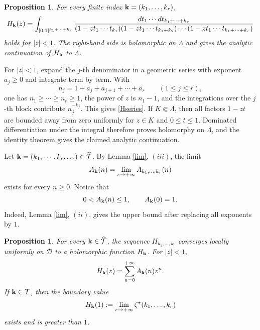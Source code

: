 \documentclass[12pt,a4paper]{amsart}
\makeatletter
\numberwithin{equation}{section}
\renewenvironment{proof}[1][Proof]{%
  \par\pushQED{\qed}%
  \normalfont\topsep6\p@\@plus6\p@\relax
  \trivlist
  \item[\hskip\labelsep\bfseries #1:]\ignorespaces
}{%
  \popQED\endtrivlist\@endpefalse
}
\theoremstyle{plain}
\newtheorem{prop}[Thm]{Proposition}
\theoremstyle{definition}
\makeatother
\begin{document}
\begin{prop}\label{equ}
For every finite index ${\bf k}=(k_1,\ldots,k_r)$,
\begin{equation}\label{cubeint}
H_{\bf k}(z)=
\int_{[0,1]^{k_1+\cdots+k_r}}
\frac{dt_1\cdots dt_{k_1+\cdots+k_r}}
{(1-zt_1\cdots t_{k_1})
 (1-zt_1\cdots t_{k_1+k_2})\cdots
 (1-zt_1\cdots t_{k_1+\cdots+k_r})}
\end{equation}
holds for $|z|<1$.  The right-hand side is holomorphic on $\Lambda$ and gives the analytic continuation of $H_{\bf k}$ to $\Lambda$.
\end{prop}

\begin{proof}
For $|z|<1$, expand the $j$-th denominator in a geometric series with exponent $a_j\geq0$ and integrate term by term.  With
\[
n_j=1+a_j+a_{j+1}+\cdots+a_r\qquad(1\leq j\leq r),
\]
one has $n_1\geq\cdots\geq n_r\geq1$, the power of $z$ is $n_1-1$, and the integrations over the $j$-th block contribute $n_j^{-k_j}$.  This gives \eqref{Hseries}.  If $K\Subset\Lambda$, then all factors $1-zt$ are bounded away from zero uniformly for $z\in K$ and $0\leq t\leq1$.  Dominated differentiation under the integral therefore proves holomorphy on $\Lambda$, and the identity theorem gives the claimed analytic continuation.
\end{proof}

Let ${\bf k}=(k_1,\cdots,k_r,\ldots)\in\widehat{\mathcal{T}}$.  By Lemma \ref{lim}, $(iii)$, the limit
\begin{equation}\label{Ainfty}
A_{\bf k}(n)=\lim_{r\rightarrow+\infty}A_{k_1,\ldots,k_r}(n)
\end{equation}
exists for every $n\geq 0$.  Notice that
\begin{equation}\label{Abound}
0<A_{\bf k}(n)\leq 1,
\qquad A_{\bf k}(0)=1.
\end{equation}
Indeed, Lemma \ref{lim}, $(ii)$, gives the upper bound after replacing all exponents by $1$.

\begin{prop}\label{exi}
For every ${\bf k}\in\widehat{\mathcal{T}}$, the sequence $H_{k_1,\ldots,k_r}$ converges locally uniformly on $\mathcal{D}$ to a holomorphic function $H_{\bf k}$.  For $|z|<1$,
\begin{equation}\label{Hinftyseries}
H_{\bf k}(z)=\sum_{n=0}^{+\infty}A_{\bf k}(n)z^n.
\end{equation}
If ${\bf k}\in\mathcal{T}$, then the boundary value
\[
H_{\bf k}(1):=\lim_{r\rightarrow+\infty}\zeta^{\star}(k_1,\ldots,k_r)
\]
exists and is greater than $1$.
\end{prop}
\end{document}

